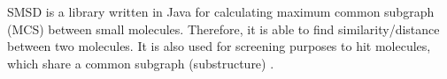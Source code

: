 SMSD is a library written in Java for calculating maximum common subgraph (MCS) between small molecules. Therefore, it is able to find similarity/distance between two molecules. It is also used for screening purposes to hit molecules, which share a common subgraph (substructure) \cite{Rahman_2009}.